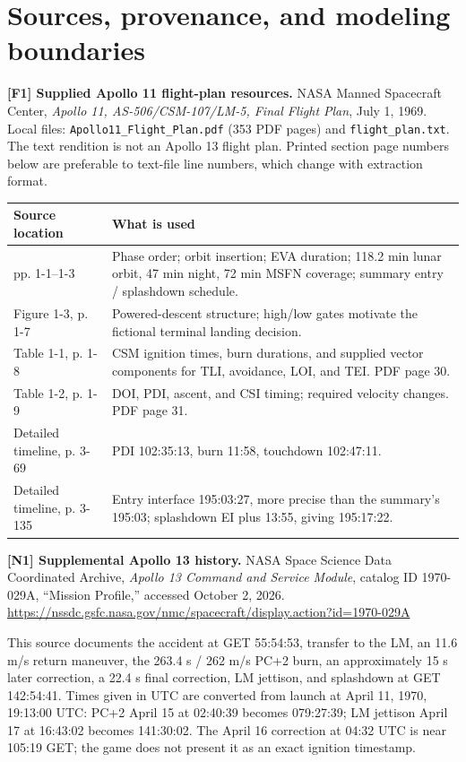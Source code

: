 \section*{Sources, provenance, and modeling boundaries}
\textbf{[F1] Supplied Apollo 11 flight-plan resources.}
NASA Manned Spacecraft Center, \emph{Apollo 11, AS-506/CSM-107/LM-5,
Final Flight Plan}, July 1, 1969.
Local files: \texttt{Apollo11\_Flight\_Plan.pdf} (353 PDF pages)
and \texttt{flight\_plan.txt}.
The text rendition is not an Apollo 13 flight plan.
Printed section page numbers below are preferable to text-file line
numbers, which change with extraction format.

\begin{tabularx}{\linewidth}{@{}lX@{}}
\toprule
Source location & What is used\\
\midrule
pp. 1-1--1-3 & Phase order; orbit insertion; EVA duration;
118.2 min lunar orbit, 47 min night, 72 min MSFN coverage;
summary entry / splashdown schedule.\\
Figure 1-3, p. 1-7 & Powered-descent structure; high/low gates motivate
the fictional terminal landing decision.\\
Table 1-1, p. 1-8 & CSM ignition times, burn durations, and supplied
vector components for TLI, avoidance, LOI, and TEI. PDF page 30.\\
Table 1-2, p. 1-9 & DOI, PDI, ascent, and CSI timing; required
velocity changes. PDF page 31.\\
Detailed timeline, p. 3-69 & PDI 102:35:13, burn 11:58,
touchdown 102:47:11.\\
Detailed timeline, p. 3-135 & Entry interface 195:03:27,
more precise than the summary's 195:03; splashdown EI plus 13:55,
giving 195:17:22.\\
\bottomrule
\end{tabularx}

\textbf{[N1] Supplemental Apollo 13 history.}
NASA Space Science Data Coordinated Archive,
\emph{Apollo 13 Command and Service Module}, catalog ID 1970-029A,
``Mission Profile,'' accessed October 2, 2026.
\url{https://nssdc.gsfc.nasa.gov/nmc/spacecraft/display.action?id=1970-029A}

This source documents the accident at GET 55:54:53, transfer to the LM,
an 11.6 m/s return maneuver, the 263.4 s / 262 m/s PC+2 burn,
an approximately 15 s later correction, a 22.4 s final correction,
LM jettison, and splashdown at GET 142:54:41.
Times given in UTC are converted from launch at April 11, 1970,
19:13:00 UTC: PC+2 April 15 at 02:40:39 becomes 079:27:39;
LM jettison April 17 at 16:43:02 becomes 141:30:02.
The April 16 correction at 04:32 UTC is near 105:19 GET;
the game does not present it as an exact ignition timestamp.

